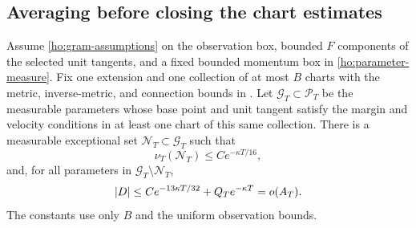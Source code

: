 \subsection{Averaging before closing the chart estimates}

\begin{proposition}
\label{prop:averaged-holonomy}
Assume \eqref{ho:gram-assumptions} on the observation box, bounded
$F$ components of the selected unit tangents, and a fixed bounded
momentum box in \eqref{ho:parameter-measure}. Fix one extension and
one collection of at most $B$ charts with the metric, inverse-metric,
and connection bounds in .
Let $\mathcal G_T\subset\mathcal P_T$ be the measurable parameters
whose base point and unit tangent satisfy the margin and velocity
conditions in at least one chart of this same collection.
There is a measurable exceptional set $\mathcal N_T\subset\mathcal G_T$
such that
\begin{equation}\label{ho:exception-bound}
 \nu_T(\mathcal N_T)\le C e^{-\kappa T/16},
\end{equation}
and, for all parameters in $\mathcal G_T\setminus\mathcal N_T$,
\begin{equation}\label{ho:D-small}
 |D|\le C e^{-13\kappa T/32}+Q_Te^{-\kappa T}
                 =o(A_T).
\end{equation}
The constants use only $B$ and the uniform observation bounds.
\end{proposition}

